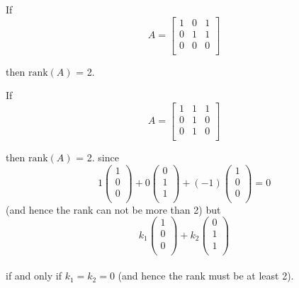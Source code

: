 \documentclass[12pt,a4paper]{article}
\theoremstyle{regla}
\theoremstyle{remark}
\theoremstyle{definition}
\theoremstyle{nonumberbreak}
\begin{document}
\begin{xmpl}


 If \[A = 
  \left[ 
   \begin{array}{ccc}
     1 & 0 & 1 \\
     0 & 1 & 1\\
     0 & 0 & 0 \\
   \end{array}
  \right]\]

then $\text{rank}(A)$ = 2.
\end{xmpl}

\begin{xmpl}

 If \[ A = 
  \left[ 
   \begin{array}{ccc}
     1 & 1 & 1 \\
     0 & 1 & 0 \\
     0 & 1 & 0 \\
   \end{array}
  \right]\]

  then $\text{rank}(A)$ = 2.
since  
\[  1
  \left(
   \begin{array}{ccc}
     1 \\
     0 \\
     0 \\
   \end{array}
  \right) +  0
  \left(
   \begin{array}{ccc}
     0 \\
     1 \\
     1 \\
   \end{array}
  \right) + (-1)
  \left(
    \begin{array}{ccc}
      1 \\
      0 \\
      0 \\
    \end{array}
   \right) = 0 \] 
(and hence the rank can not be more than 2) 
but  
\[  k_1
  \left(
   \begin{array}{ccc}
     1 \\
     0 \\
     0 \\
   \end{array}
  \right) +  k_2
  \left(
   \begin{array}{ccc}
     0 \\
     1 \\
     1 \\
   \end{array}
  \right)\] \\ if and only if $k_1=k_2=0$ (and hence the rank must be at least 2).
\end{xmpl}
\end{document}
